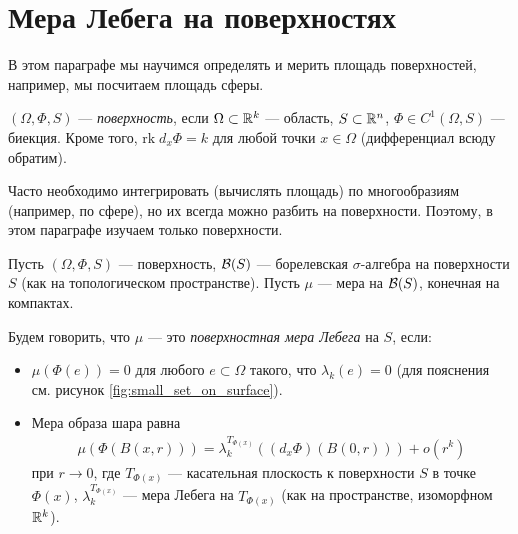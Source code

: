 
\section{Мера Лебега на поверхностях}

В этом параграфе мы научимся определять и мерить площадь поверхностей, например, мы посчитаем площадь сферы.

\begin{df}
 $(\Omega, \Phi, S)$ --- \textit{поверхность}, если $\Omega \subset \mathbb{R}^{k}$ --- область, $S \subset \mathbb{R}^{n}$, $\Phi \in C^{1}(\Omega, S)$ --- биекция. Кроме того, $\mathrm{rk}\; d_{x} \Phi = k$ для любой точки $x \in \Omega$ (дифференциал всюду обратим).
\end{df}
\begin{remrk*}
 Часто необходимо интегрировать (вычислять площадь) по многообразиям (например, по сфере), но их всегда можно разбить на поверхности. Поэтому, в этом параграфе изучаем только поверхности.
\end{remrk*}

\begin{df}
 \label{definition:lebesgue_measure_on_surface}
 Пусть $(\Omega, \Phi, S)$ --- поверхность, $\mathcal{B}(S)$ --- борелевская $\sigma$-алгебра на поверхности $S$ (как на топологическом пространстве). Пусть $\mu$ --- мера на $\mathcal{B}(S)$, конечная на компактах.

 Будем говорить, что $\mu$ --- это \textit{поверхностная мера Лебега} на $S$, если:
 \begin{itemize}
  \item $\mu(\Phi(e)) = 0$ для любого $e \subset \Omega$ такого, что $\lambda_k(e) = 0$ (для пояснения см. рисунок \ref{fig:small_set_on_surface}).
  \item Мера образа шара равна 
\begin{align}
 \label{equation:surface_lebesgue_measure_ball}
\mu(\Phi(B(x,r))) = \lambda_k^{T_{\Phi(x)}}((d_x \Phi)(B(0, r))) + o(r^{k})
\end{align}
при $r \to 0$, где $T_{\Phi(x)}$ --- касательная плоскость к поверхности $S$ в точке $\Phi(x)$, $\lambda_k^{T_{\Phi(x)}}$ --- мера Лебега на $T_{\Phi(x)}$ (как на пространстве, изоморфном $\mathbb{R}^{k}$).
 \end{itemize}
\end{df}

